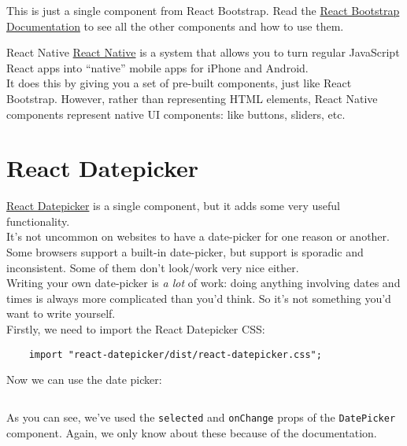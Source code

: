 This is just a single component from React Bootstrap. Read the \href{https://react-bootstrap.github.io/getting-started/introduction/}{React Bootstrap Documentation} to see all the other components and how to use them.

\begin{infobox}{React Native}
    \href{https://facebook.github.io/react-native/}{React Native} is a system that allows you to turn regular JavaScript React apps into ``native'' mobile apps for iPhone and Android.
    \\

    It does this by giving you a set of pre-built components, just like React Bootstrap. However, rather than representing HTML elements, React Native components represent native UI components: like buttons, sliders, etc.
\end{infobox}


\section{React Datepicker}

\href{https://github.com/Hacker0x01/react-datepicker/}{React Datepicker} is a single component, but it adds some very useful functionality.
\\

It's not uncommon on websites to have a date-picker for one reason or another. Some browsers support a built-in date-picker, but support is sporadic and inconsistent. Some of them don't look/work very nice either.
\\

Writing your own date-picker is \textit{a lot} of work: doing anything involving dates and times is always more complicated than you'd think. So it's not something you'd want to write yourself.
\\

Firstly, we need to import the React Datepicker CSS:

\begin{verbatim}
    import "react-datepicker/dist/react-datepicker.css";
\end{verbatim}

Now we can use the date picker:

\inputminted{js}{06/figures/01/02-Dates.js}

As you can see, we've used the \texttt{selected} and \texttt{onChange} props of the \texttt{DatePicker} component. Again, we only know about these because of the documentation.
\\

